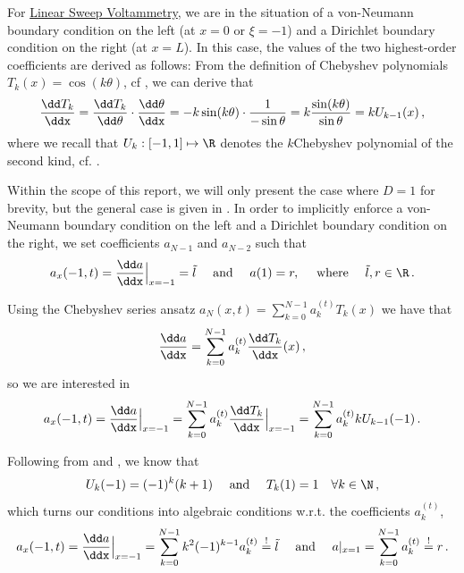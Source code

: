 \documentclass{prettytex/ox/mmsc-special-topic}
\begin{document}
  For \underline{Linear Sweep Voltammetry}, we are in the situation of a von-Neumann boundary condition on the left (at $x = 0$ or $\xi = -1$) and a Dirichlet boundary condition on the right (at $x = L$).
  In this case, the values of the two highest-order coefficients are derived as follows:
  From the definition of Chebyshev polynomials $T_k(x) = \cos(k\theta)$, cf , we can derive that
  $$\frac{\dd T_k}{\ddx} = \frac{\dd T_k}{\dd\theta} \cdot \frac{\dd\theta}{\ddx} = -k \sin(k\theta) \cdot \frac{1}{-\sin \theta} = k \frac{\sin(k\theta)}{\sin \theta} = k U_{k-1}(x)\,,$$
  where we recall that $U_k: [-1, 1] \mapsto \R$ denotes the $k$\th Chebyshev polynomial of the second kind, cf. .

  Within the scope of this report, we will only present the case where $D = 1$ for brevity, but the general case is given in .
  In order to implicitly enforce a von-Neumann boundary condition on the left and a Dirichlet boundary condition on the right, we set coefficients $a_{N-1}$ and $a_{N-2}$ such that
  $$a_x(-1, t) = \frac{\dd a}{\ddx}\Big|_{x=-1} = \tilde{l} \quad \text{ and } \quad a(1) = r, \quad \text{ where } \quad \tilde{l}, r \in \R\,.$$

  Using the Chebyshev series ansatz
  $a_N(x, t) = \sum_{k=0}^{N-1} a_k^{(t)} T_k(x)$
  we have that
  $$\frac{\dd a}{\ddx} = \sum_{k=0}^{N-1} a_k^{(t)} \frac{\dd T_k}{\ddx}(x)\,,$$
  so we are interested in
  $$a_x(-1, t) = \frac{\dd a}{\ddx}\Big|_{x=-1} = \sum_{k=0}^{N-1} a_k^{(t)} \frac{\dd T_k}{\ddx}\Big|_{x=-1} = \sum_{k=0}^{N-1} a_k^{(t)} k U_{k-1}(-1)\,.$$

  Following from  and , we know that
  $$U_k(-1) = (-1)^k (k+1) \quad \text{ and } \quad T_k(1) = 1 \quad \forall k \in \N\,,$$
  which turns our conditions into algebraic conditions w.r.t. the coefficients $a_k^{(t)}$,
  $$a_x(-1, t) = \frac{\dd a}{\ddx}\Big|_{x=-1} = \sum_{k=0}^{N-1} k^2 (-1)^{k-1} a_k^{(t)} \overset{!}{=} \tilde{l} \quad \text{ and } \quad a|_{x=1} = \sum_{k=0}^{N-1} a_k^{(t)} \overset{!}{=} r\,.$$
\end{document}

